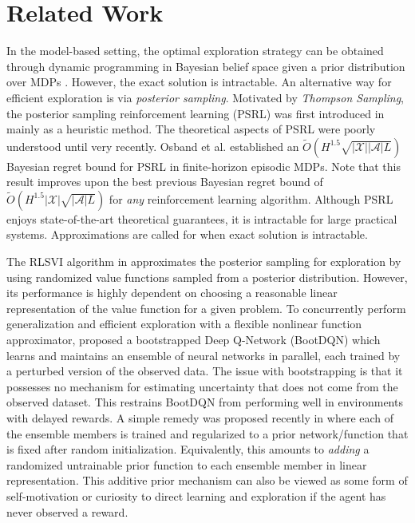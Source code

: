 \documentclass[letterpaper]{article} %
\newcommand{\Sp}[1]{\left(#1\right)}
\newcommand{\abs}[1]{\left|#1\right|}
\newcommand{\aX}{\abs{\mathcal{X}}}
\newcommand{\aA}{\abs{\mathcal{A}}}
\theoremstyle{definition}
\begin{document}
\section{Related Work}
In the model-based setting, the optimal exploration strategy can be obtained through dynamic programming in Bayesian belief space given a prior distribution over MDPs \cite{guez2012efficient}. However, the exact solution is intractable. An alternative way for efficient exploration is via \emph{posterior sampling}. Motivated by \emph{Thompson Sampling}, the posterior sampling reinforcement learning (PSRL) was first introduced in \cite{strens2000bayesian} mainly as a heuristic method. The theoretical aspects of PSRL were poorly understood until very recently. Osband et al. \cite{osband2017posterior} established an $\widetilde{O}\Sp{H^{1.5}\sqrt{\aX\aA L}}$ Bayesian regret bound for PSRL in finite-horizon episodic MDPs. Note that this result improves upon the best previous Bayesian regret bound of $\widetilde{O}\Sp{H^{1.5}\aX\sqrt{\aA L}}$ for \emph{any} reinforcement learning algorithm. Although PSRL enjoys state-of-the-art theoretical guarantees, it is intractable for large practical systems. Approximations are called for when exact solution is intractable.

The RLSVI algorithm in \cite{osband2017deep} approximates the posterior sampling for exploration by using randomized value functions sampled from a posterior distribution. However, its performance is highly dependent on choosing a reasonable linear representation of the value function for a given problem. To concurrently perform generalization and efficient exploration with a flexible nonlinear function approximator, \cite{osband2016deep} proposed a bootstrapped Deep Q-Network (BootDQN) which learns and maintains an ensemble of neural networks in parallel, each trained by a perturbed version of the observed data. The issue with bootstrapping is that it possesses no mechanism for estimating uncertainty that does not come from the observed dataset. This restrains BootDQN from performing well in environments with delayed rewards. A simple remedy was proposed recently in \cite{osband2018randomized} where each of the ensemble members is trained and regularized to a prior network/function that is fixed after random initialization. Equivalently, this amounts to \emph{adding} a randomized untrainable prior function to each ensemble member in linear representation. This additive prior mechanism can also be viewed as some form of self-motivation or curiosity to direct learning and exploration if the agent has never observed a reward.
\end{document}
